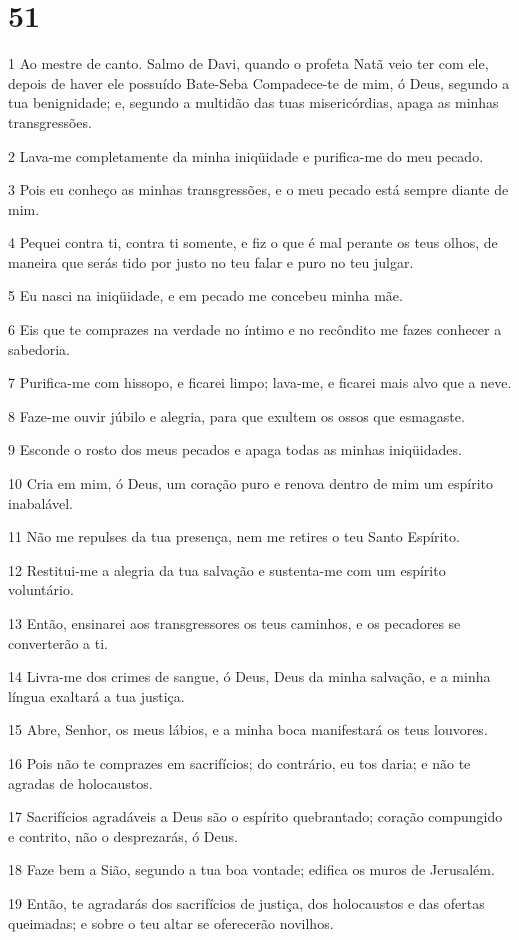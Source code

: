 \chapter{51}

\par 1 Ao mestre de canto. Salmo de Davi, quando o profeta Natã veio ter com ele, depois de haver ele possuído Bate-Seba Compadece-te de mim, ó Deus, segundo a tua benignidade; e, segundo a multidão das tuas misericórdias, apaga as minhas transgressões.
\par 2 Lava-me completamente da minha iniqüidade e purifica-me do meu pecado.
\par 3 Pois eu conheço as minhas transgressões, e o meu pecado está sempre diante de mim.
\par 4 Pequei contra ti, contra ti somente, e fiz o que é mal perante os teus olhos, de maneira que serás tido por justo no teu falar e puro no teu julgar.
\par 5 Eu nasci na iniqüidade, e em pecado me concebeu minha mãe.
\par 6 Eis que te comprazes na verdade no íntimo e no recôndito me fazes conhecer a sabedoria.
\par 7 Purifica-me com hissopo, e ficarei limpo; lava-me, e ficarei mais alvo que a neve.
\par 8 Faze-me ouvir júbilo e alegria, para que exultem os ossos que esmagaste.
\par 9 Esconde o rosto dos meus pecados e apaga todas as minhas iniqüidades.
\par 10 Cria em mim, ó Deus, um coração puro e renova dentro de mim um espírito inabalável.
\par 11 Não me repulses da tua presença, nem me retires o teu Santo Espírito.
\par 12 Restitui-me a alegria da tua salvação e sustenta-me com um espírito voluntário.
\par 13 Então, ensinarei aos transgressores os teus caminhos, e os pecadores se converterão a ti.
\par 14 Livra-me dos crimes de sangue, ó Deus, Deus da minha salvação, e a minha língua exaltará a tua justiça.
\par 15 Abre, Senhor, os meus lábios, e a minha boca manifestará os teus louvores.
\par 16 Pois não te comprazes em sacrifícios; do contrário, eu tos daria; e não te agradas de holocaustos.
\par 17 Sacrifícios agradáveis a Deus são o espírito quebrantado; coração compungido e contrito, não o desprezarás, ó Deus.
\par 18 Faze bem a Sião, segundo a tua boa vontade; edifica os muros de Jerusalém.
\par 19 Então, te agradarás dos sacrifícios de justiça, dos holocaustos e das ofertas queimadas; e sobre o teu altar se oferecerão novilhos.

